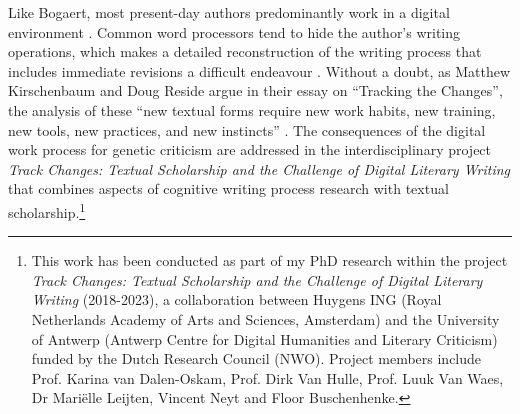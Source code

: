 \begin{paper}
Like Bogaert, most present-day authors predominantly work in a digital
environment \citep{kirschenbaum_tracking_2013,van_hulle_modern_2014,buschenhenke_het_2016,kirschenbaum_track_2016,vauthier_genetic_2016,ries_rationale_2018}. Common word
processors tend to hide the author's writing operations, which makes a detailed
reconstruction of the writing process that includes immediate
revisions a difficult endeavour \citep{mathijsen_genetic_2009}. Without a doubt, as Matthew Kirschenbaum and Doug Reside argue in their essay on ``Tracking the Changes'', the analysis of these
``new textual forms require new work habits, new training, new tools,
new practices, and new instincts'' \citep[272]{kirschenbaum_tracking_2013}.
The consequences of the digital work process for genetic criticism are
addressed in the interdisciplinary project \emph{Track Changes: Textual
Scholarship and the Challenge of Digital Literary Writing} that combines
aspects of cognitive writing process research with textual
scholarship.\footnote{This work has been conducted as part of my PhD
  research within the project \emph{Track Changes: Textual Scholarship
  and the Challenge of Digital Literary Writing} (2018-2023), a
  collaboration between Huygens ING (Royal Netherlands Academy of Arts
  and Sciences, Amsterdam) and the University of Antwerp (Antwerp Centre
  for Digital Humanities and Literary Criticism) funded by the Dutch
  Research Council (NWO). Project members include Prof. Karina van
  Dalen-Oskam, Prof. Dirk Van Hulle, Prof. Luuk Van Waes, Dr Mariëlle
  Leijten, Vincent Neyt and Floor Buschenhenke.}


\end{paper}
